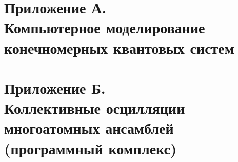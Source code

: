 \chapter*{Приложение А.\\Компьютерное моделирование конечномерных квантовых систем}\label{app:A}
\chapter*{Приложение Б.\\Коллективные осцилляции многоатомных ансамблей\\(программный комплекс)}\label{app:B}


\
\\[0pt]


\clearpage

\
\\[0pt]

\
\\[0pt]

\
\\[0pt]

\
\\[0pt]


\clearpage

